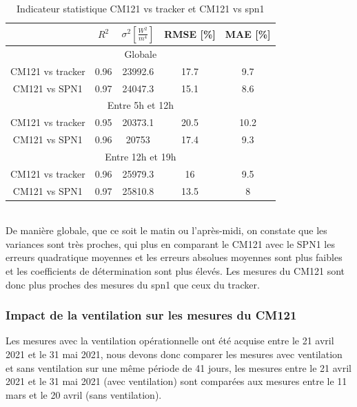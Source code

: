 \documentclass[12pt,a4paper]{article}
\begin{document}
\begin{flushleft}
\begin{table}[H]
\begin{center}
\begin{tabular}{ |c|c|c|c|c| } 
 \hline
  & $R^2$ & $\sigma ^2 [\frac{W^2}{m^4}]$ & RMSE [\%] & MAE [\%] \\ 
  \hline
  \multicolumn{5}{|c|}{Globale} \\
  \hline
 CM121 vs tracker & 0.96 & 23992.6 & 17.7 & 9.7\\ 
 \hline
 CM121 vs SPN1 & 0.97 & 24047.3 & 15.1 & 8.6 \\ 
 \hline
  \multicolumn{5}{|c|}{Entre 5h et 12h} \\
  \hline
   CM121 vs tracker & 0.95 & 20373.1 & 20.5 & 10.2\\ 
 \hline
 CM121 vs SPN1 & 0.96 & 20753 & 17.4 & 9.3 \\
 \hline
  \multicolumn{5}{|c|}{Entre 12h et 19h} \\
  \hline 
   CM121 vs tracker & 0.96 & 25979.3 & 16 & 9.5\\ 
 \hline
 CM121 vs SPN1 & 0.97 & 25810.8 & 13.5 & 8 \\
 \hline
\end{tabular}
\caption{Indicateur statistique CM121 vs tracker et CM121 vs spn1}
\end{center}
\end{table}

~\\
De manière globale, que ce soit le matin ou l'après-midi, on constate que les variances sont très proches, qui plus en comparant le CM121 avec le SPN1 les erreurs quadratique moyennes et les erreurs absolues moyennes sont plus faibles et les coefficients de détermination sont plus élevés. Les mesures du CM121 sont donc plus proches des mesures du spn1 que ceux du tracker.  \\



\subsubsection{Impact de la  ventilation sur les mesures du CM121}

Les mesures avec la ventilation opérationnelle ont été acquise entre le 21 avril 2021 et le 31 mai 2021, nous devons donc comparer les mesures avec ventilation et sans ventilation sur une même période de 41 jours, les mesures entre le 21 avril 2021 et le 31 mai 2021 (avec ventilation) sont comparées aux mesures entre le 11 mars et le 20 avril (sans ventilation).


\end{flushleft}
\end{document}
